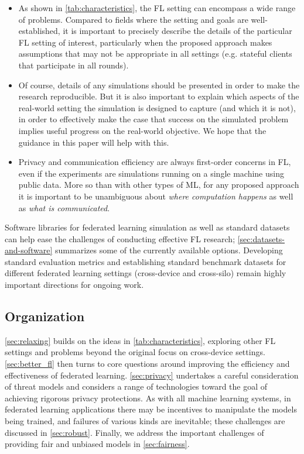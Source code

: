 \documentclass[11pt]{article}
\begin{document}
\begin{itemize}
    \item As shown in \cref{tab:characteristics}, the FL setting can encompass a wide range of problems. Compared to fields where the setting and goals are well-established, it is important to precisely describe the details of the particular FL setting of interest, particularly when the proposed approach makes assumptions that may not be appropriate in all settings (e.g. stateful clients that participate in all rounds).
    
    \item Of course, details of any simulations should be presented in order to make the research reproducible. But it is also important to explain which aspects of the real-world setting the simulation is designed to capture (and which it is not), in order to effectively make the case that success on the simulated problem implies useful progress on the real-world objective. We hope that the guidance in this paper will help with this.
    
    \item Privacy and communication efficiency are always first-order concerns in FL, even if the experiments are simulations running on a single machine using public data.  More so than with other types of ML, for any proposed approach it is important to be unambiguous about \emph{where computation happens} as well as \emph{what is communicated}.
\end{itemize}

Software libraries for federated learning simulation as well as standard datasets can help ease the challenges of conducting effective FL research; \cref{sec:datasets-and-software} summarizes some of the currently available options. Developing standard evaluation metrics and establishing standard benchmark datasets for different federated learning settings (cross-device and cross-silo) remain highly important directions for ongoing work.

\subsection{Organization}
\cref{sec:relaxing} builds on the ideas in \cref{tab:characteristics}, exploring other FL settings and problems beyond the original focus on cross-device settings. \cref{sec:better_fl} then turns to core questions around improving the efficiency and effectiveness of federated learning.
%
\cref{sec:privacy} undertakes a careful consideration of threat models and considers a range of technologies toward the goal of achieving rigorous privacy protections. As with all machine learning systems, in federated learning applications there may be incentives to manipulate the models being trained, and failures of various kinds are inevitable; these challenges are discussed in \cref{sec:robust}. Finally, we address the important challenges of providing fair and unbiased models in \cref{sec:fairness}.
\end{document}
